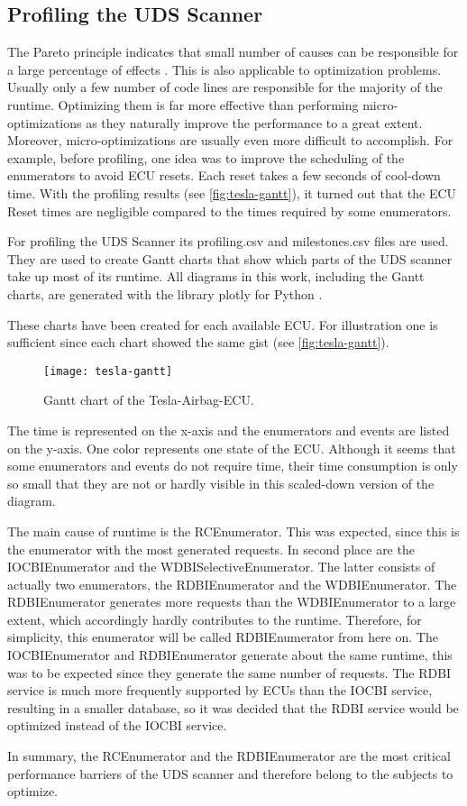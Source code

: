 \subsection{Profiling the UDS Scanner}

The Pareto principle indicates that small number of causes can be responsible for a large percentage of effects \cite{pareto}. This is also applicable to optimization problems. Usually only a few number of code lines are responsible for the majority of the runtime. Optimizing them is far more effective than performing micro-optimizations as they naturally improve the performance to a great extent. Moreover, micro-optimizations are usually even more difficult to accomplish. For example, before profiling, one idea was to improve the scheduling of the enumerators to avoid ECU resets. Each reset takes a few seconds of cool-down time. With the profiling results (see \autoref{fig:tesla-gantt}), it turned out that the ECU Reset times are negligible compared to the times required by some enumerators.

For profiling the UDS Scanner its profiling.csv and milestones.csv files are used. They are used to create Gantt charts that show which parts of the UDS scanner take up most of its runtime. All diagrams in this work, including the Gantt charts, are generated with the library plotly for Python \cite{plotly}.

These charts have been created for each available ECU. For illustration one is sufficient since each chart showed the same gist (see \autoref{fig:tesla-gantt}).

\begin{figure}[h]
    \centering
    \texttt{[image: tesla-gantt]}
    \caption{Gantt chart of the Tesla-Airbag-ECU.}
    \label{fig:tesla-gantt}
\end{figure}

The time is represented on the x-axis and the enumerators and events are listed on the y-axis. One color represents one state of the ECU.
Although it seems that some enumerators and events do not require time, their time consumption is only so small that they are not or hardly visible in this scaled-down version of the diagram.

The main cause of runtime is the RCEnumerator. This was expected, since this is the enumerator with the most generated requests. In second place are the IOCBIEnumerator and the WDBISelectiveEnumerator. The latter consists of actually two enumerators, the RDBIEnumerator and the WDBIEnumerator. The RDBIEnumerator generates more requests than the WDBIEnumerator to a large extent, which accordingly hardly contributes to the runtime. Therefore, for simplicity, this enumerator will be called RDBIEnumerator from here on.
The IOCBIEnumerator and RDBIEnumerator generate about the same runtime, this was to be expected since they generate the same number of requests. The RDBI service is much more frequently supported by ECUs than the IOCBI service, resulting in a smaller database, so it was decided that the RDBI service would be optimized instead of the IOCBI service.

In summary, the RCEnumerator and the RDBIEnumerator are the most critical performance barriers of the UDS scanner and therefore belong to the subjects to optimize.

